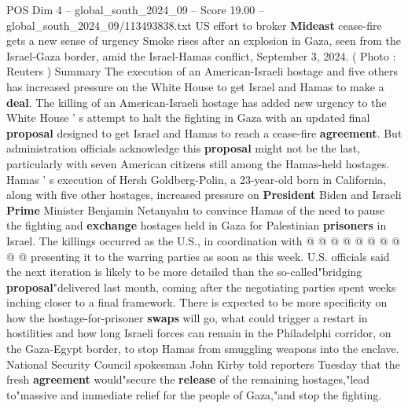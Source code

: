 \begin{textsample}{POS Dim 4 – global\_south\_2024\_09 – Score 19.00 – global\_south\_2024\_09/113493838.txt}  \label{ex:f4_pos_296}
US effort to broker \textbf{Mideast} cease-fire gets a new sense of urgency Smoke rises after an explosion in Gaza, seen from the Israel-Gaza border, amid the Israel-Hamas conflict, September 3, 2024. ( Photo : Reuters ) Summary The execution of an American-Israeli hostage and five others has increased pressure on the White House to get Israel and Hamas to make a \textbf{deal}.
The killing of an American-Israeli hostage has added new urgency to the White House ' s attempt to halt the fighting in Gaza with an updated final \textbf{proposal} designed to get Israel and Hamas to reach a cease-fire \textbf{agreement}.
But administration officials acknowledge this \textbf{proposal} might not be the last, particularly with seven American citizens still among the Hamas-held hostages.
Hamas ' s execution of Hersh Goldberg-Polin, a 23-year-old born in California, along with five other hostages, increased pressure on \textbf{President} Biden and Israeli \textbf{Prime} Minister Benjamin Netanyahu to convince Hamas of the need to pause the fighting and \textbf{exchange} hostages held in Gaza for Palestinian \textbf{prisoners} in Israel.
The killings occurred as the U.S., in coordination with @ @ @ @ @ @ @ @ @ @ presenting it to the warring parties as soon as this week.
U.S. officials said the next iteration is likely to be more detailed than the so-called"bridging \textbf{proposal}"delivered last month, coming after the negotiating parties spent weeks inching closer to a final framework.
There is expected to be more specificity on how the hostage-for-prisoner \textbf{swaps} will go, what could trigger a restart in hostilities and how long Israeli forces can remain in the Philadelphi corridor, on the Gaza-Egypt border, to stop Hamas from smuggling weapons into the enclave.
National Security Council spokesman John Kirby told reporters Tuesday that the fresh \textbf{agreement} would"secure the \textbf{release} of the remaining hostages,"lead to"massive and immediate relief for the people of Gaza,"and stop the fighting.

\end{textsample}

